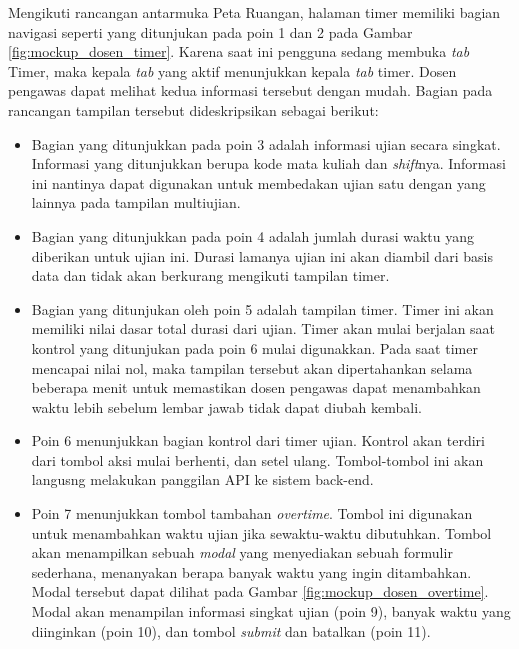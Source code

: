     Mengikuti rancangan antarmuka Peta Ruangan, halaman timer memiliki bagian
    navigasi seperti yang ditunjukan pada poin 1 dan 2 pada Gambar
    \ref{fig:mockup_dosen_timer}. Karena saat ini pengguna sedang membuka
    \textit{tab} Timer, maka kepala \textit{tab} yang aktif menunjukkan kepala
    \textit{tab} timer. Dosen pengawas dapat melihat kedua informasi tersebut
    dengan mudah. Bagian pada rancangan tampilan tersebut dideskripsikan sebagai
    berikut:
    
    \begin{itemize}
        \item Bagian yang ditunjukkan pada poin 3 adalah informasi ujian secara
            singkat. Informasi yang ditunjukkan berupa kode mata kuliah dan
            \textit{shift}nya. Informasi ini nantinya dapat digunakan untuk
            membedakan ujian satu dengan yang lainnya pada tampilan multiujian.
            
        \item Bagian yang ditunjukkan pada poin 4 adalah jumlah durasi waktu
            yang diberikan untuk ujian ini. Durasi lamanya ujian ini akan
            diambil dari basis data dan tidak akan berkurang mengikuti tampilan
            timer.
        
        \item Bagian yang ditunjukan oleh poin 5 adalah tampilan timer. Timer
            ini akan memiliki nilai dasar total durasi dari ujian. Timer akan
            mulai berjalan saat kontrol yang ditunjukan pada poin 6 mulai
            digunakkan. Pada saat timer mencapai nilai nol, maka tampilan
            tersebut akan dipertahankan selama beberapa menit untuk memastikan
            dosen pengawas dapat menambahkan waktu lebih sebelum lembar jawab
            tidak dapat diubah kembali.
        
        \item Poin 6 menunjukkan bagian kontrol dari timer ujian. Kontrol
            akan terdiri dari tombol aksi mulai berhenti, dan setel ulang.
            Tombol-tombol ini akan langusng melakukan panggilan API
            ke sistem back-end.
        
        \item Poin 7 menunjukkan tombol tambahan \textit{overtime}. Tombol ini
            digunakan untuk menambahkan waktu ujian jika sewaktu-waktu
            dibutuhkan. Tombol akan menampilkan sebuah \textit{modal} yang
            menyediakan sebuah formulir sederhana, menanyakan berapa banyak
            waktu yang ingin ditambahkan. Modal tersebut dapat dilihat pada
            Gambar \ref{fig:mockup_dosen_overtime}. Modal akan menampilan
            informasi singkat ujian (poin 9), banyak waktu yang diinginkan (poin
            10), dan tombol
            \textit{submit} dan batalkan (poin 11).
        

\end{itemize}
